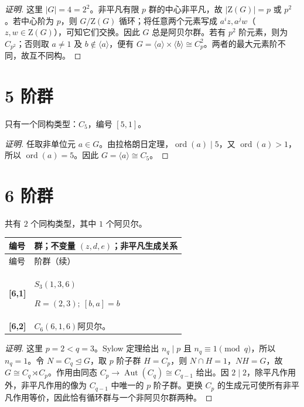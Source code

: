 \documentclass[UTF8,fontset=fandol,11pt,a4paper]{ctexart}
\newcommand{\Aut}{\operatorname{Aut}}\newcommand{\GL}{\operatorname{GL}}\newcommand{\ord}{\operatorname{ord}}\newcommand{\Z}{\mathrm Z}
\begin{document}
\begin{proof}[证明]
这里 $|G|=4=2^2$。非平凡有限 $p$ 群的中心非平凡，故 $|\Z(G)|=p$ 或 $p^2$。若中心阶为 $p$，则 $G/\Z(G)$ 循环；将任意两个元素写成 $a^iz,a^jw$（$z,w\in\Z(G)$），可知它们交换。因此 $G$ 总是阿贝尔群。若有 $p^2$ 阶元素，则为 $C_{p^2}$；否则取 $a\ne1$ 及 $b\notin\langle a\rangle$，便有 $G=\langle a\rangle\times\langle b\rangle\cong C_p^2$。两者的最大元素阶不同，故互不同构。
\end{proof}

\section*{5 阶群}\label{order:5}

只有一个同构类型：$C_{5}$，编号 $[5,1]$。

\begin{proof}[证明]
任取非单位元 $a\in G$。由拉格朗日定理，$\ord(a)\mid 5$，又 $\ord(a)>1$，所以 $\ord(a)=5$。因此 $G=\langle a\rangle\cong C_{5}$。
\end{proof}

\section*{6 阶群}\label{order:6}

共有 $2$ 个同构类型，其中 $1$ 个阿贝尔。

\begingroup\small\setlength{\tabcolsep}{3pt}\renewcommand{\arraystretch}{1.12}

\begin{longtable}{@{}p{17mm}>{\raggedright\arraybackslash}p{141mm}@{}}

\toprule 编号 & 群；不变量 $(z,d,e)$；非平凡生成关系\\\midrule\endfirsthead

\toprule 编号 & 6 阶群（续）\\\midrule\endhead\bottomrule\endfoot

\textbf{[6,1]} & $S_{3}$\quad $(1,3,6)$\par\(R=(2,3);\allowbreak\ [b,a]=b\)\\[3pt]

\textbf{[6,2]} & $C_{6}$\quad $(6,1,6)$\quad 阿贝尔。\\[3pt]

\end{longtable}\endgroup

\begin{proof}[证明]
这里 $p=2<q=3$。Sylow 定理给出 $n_q\mid p$ 且 $n_q\equiv1\pmod q$，所以 $n_q=1$。令 $N=C_q\trianglelefteq G$，取 $p$ 阶子群 $H=C_p$，则 $N\cap H=1$，$NH=G$，故 $G\cong C_q\rtimes C_p$。作用由同态 $C_p\to\Aut(C_q)\cong C_{q-1}$ 给出。因 $2\mid 2$，除平凡作用外，非平凡作用的像为 $C_{q-1}$ 中唯一的 $p$ 阶子群。更换 $C_p$ 的生成元可使所有非平凡作用等价，因此恰有循环群与一个非阿贝尔群两种。
\end{proof}
\end{document}
